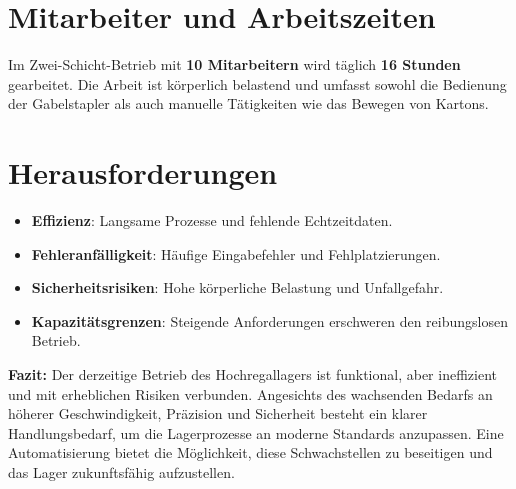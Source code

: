 \section*{Mitarbeiter und Arbeitszeiten}
Im Zwei-Schicht-Betrieb mit \textbf{10 Mitarbeitern} wird täglich \textbf{16 Stunden} gearbeitet. Die Arbeit ist körperlich belastend und umfasst sowohl die Bedienung der Gabelstapler als auch manuelle Tätigkeiten wie das Bewegen von Kartons.

\section*{Herausforderungen}
\begin{itemize}
	\item \textbf{Effizienz}: Langsame Prozesse und fehlende Echtzeitdaten.
	\item \textbf{Fehleranfälligkeit}: Häufige Eingabefehler und Fehlplatzierungen.
	\item \textbf{Sicherheitsrisiken}: Hohe körperliche Belastung und Unfallgefahr.
	\item \textbf{Kapazitätsgrenzen}: Steigende Anforderungen erschweren den reibungslosen Betrieb.
\end{itemize}

\textbf{Fazit:} Der derzeitige Betrieb des Hochregallagers ist funktional, aber ineffizient und mit erheblichen Risiken verbunden. Angesichts des wachsenden Bedarfs an höherer Geschwindigkeit, Präzision und Sicherheit besteht ein klarer Handlungsbedarf, um die Lagerprozesse an moderne Standards anzupassen. Eine Automatisierung bietet die Möglichkeit, diese Schwachstellen zu beseitigen und das Lager zukunftsfähig aufzustellen.
